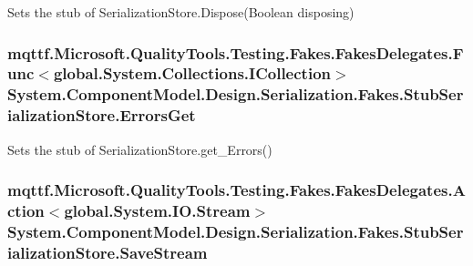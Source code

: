 Sets the stub of Serialization\-Store.\-Dispose(\-Boolean disposing)

\hypertarget{class_system_1_1_component_model_1_1_design_1_1_serialization_1_1_fakes_1_1_stub_serialization_store_aa909ff6b962230b88af67fbada4f5451}{
\subsubsection[{Errors\-Get}]{\setlength{\rightskip}{0pt plus 5cm}mqttf.\-Microsoft.\-Quality\-Tools.\-Testing.\-Fakes.\-Fakes\-Delegates.\-Func$<$global.\-System.\-Collections.\-I\-Collection$>$ System.\-Component\-Model.\-Design.\-Serialization.\-Fakes.\-Stub\-Serialization\-Store.\-Errors\-Get}}\label{class_system_1_1_component_model_1_1_design_1_1_serialization_1_1_fakes_1_1_stub_serialization_store_aa909ff6b962230b88af67fbada4f5451}


Sets the stub of Serialization\-Store.\-get\-\_\-\-Errors()

\hypertarget{class_system_1_1_component_model_1_1_design_1_1_serialization_1_1_fakes_1_1_stub_serialization_store_a198f4ee217126ef526649dc8830dc818}{
\subsubsection[{Save\-Stream}]{\setlength{\rightskip}{0pt plus 5cm}mqttf.\-Microsoft.\-Quality\-Tools.\-Testing.\-Fakes.\-Fakes\-Delegates.\-Action$<$global.\-System.\-I\-O.\-Stream$>$ System.\-Component\-Model.\-Design.\-Serialization.\-Fakes.\-Stub\-Serialization\-Store.\-Save\-Stream}}\label{class_system_1_1_component_model_1_1_design_1_1_serialization_1_1_fakes_1_1_stub_serialization_store_a198f4ee217126ef526649dc8830dc818}


